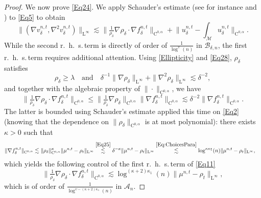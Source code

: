 \documentclass[11pt,a4paper,oneside]{amsart}
\numberwithin{equation}{section}
\newcommand{\cc}{\text{C}}
\newcommand{\LL}{\mathrm{L}}
\newcommand{\rhs}{r.~h.~s.\,}
\begin{document}
\begin{proof}
We now prove \eqref{Eq24}. We apply Schauder's estimate (see for instance \cite{gilbarg2015elliptic} and \cite[Chapter 10]{nicolaescu2020lectures}) to \eqref{Eq5} to obtain
%
\begin{equation}\label{Eq11}
\big\|(\nabla v^{n,t}_{\delta},\nabla^2 v^{n,t}_{\delta})\big\|_{\LL^{\infty}}\lesssim \|\tfrac{1}{\rho_{\delta}}\nabla\rho_\delta\cdot\nabla f^{n,t}_\delta\|_{\cc^{0,\alpha}}+\Big\|u^{n,t}_{\delta}-\int_{\mathcal{M}}u^{n,t}_\delta\Big\|_{\cc^{0,\alpha}}.
\end{equation}
%
While the second \rhs term is directly of order of $\frac{1}{\log^{\upsilon}(n)}$ in $\mathcal{B}_{\delta,n}$, the first \rhs term requires additional attention. Using \eqref{Ellipticity} and \eqref{Eq28}, $\rho_\delta$ satisfies
%
\begin{equation}\label{Eq25}
\rho_{\delta}\geq \lambda\quad \text{and}\quad \delta^{-1}\|\nabla\rho_{\delta}\|_{\LL^{\infty}}+\|\nabla^2\rho_{\delta}\|_{\LL^{\infty}}\lesssim \delta^{-2},
\end{equation}
%
and together with the algebraic property of $\|\cdot\|_{\cc^{0,\alpha}}$, we have
%
$$\|\tfrac{1}{\rho_{\delta}}\nabla\rho_\delta\cdot\nabla f^{n,t}_\delta\|_{\cc^{0,\alpha}}\leq \|\tfrac{1}{\rho_{\delta}}\nabla\rho_\delta\|_{\cc^{0,\alpha}}\|\nabla f^{n,t}_\delta\|_{\cc^{0,\alpha}}\lesssim \delta^{-2}\|\nabla f^{n,t}_\delta\|_{\cc^{0,\alpha}}.$$
%
The latter is bounded using Schauder's estimate applied this time on \eqref{Eq2} (knowing that the dependence on $\|\rho_{\delta}\|_{\cc^{0,\alpha}}$ is at most polynomial): there exists $\kappa>0$ such that
%
\begin{equation*}
\begin{aligned}
\|\nabla f^{n,t}_\delta\|_{\cc^{0,\alpha}}&\lesssim \|\rho_{\delta}\|^{\kappa}_{\cc^{0,\alpha}}\|\mu^{n,t}-\rho_t\|_{\LL^{\infty}}\stackrel{\eqref{Eq25}}{\lesssim} \delta^{-\kappa}\|\mu^{n,t}-\rho_t\|_{\LL^{\infty}}\stackrel{\eqref{Eq:ChoicesPara}}{\lesssim} \log^{\kappa\kappa_1}(n)\|\mu^{n,t}-\rho_t\|_{\LL^{\infty}},
\end{aligned}
%
\end{equation*}
%
which yields the following control of the first \rhs term of \eqref{Eq11}
%
\begin{equation}\label{Eq7}
\|\tfrac{1}{\rho_{\delta}}\nabla\rho_\delta\cdot\nabla f^{n,t}_\delta\|_{\cc^{0,\alpha}}\lesssim \log^{(\kappa+2)\kappa_1}(n)\|\mu^{n,t}-\rho_t\|_{\LL^{\infty}},
\end{equation}
%
which is of order of $\frac{1}{\log^{\upsilon-(\kappa+2)\kappa_1}(n)}$ in $\mathcal{A}_n$.


\end{proof}
\end{document}
